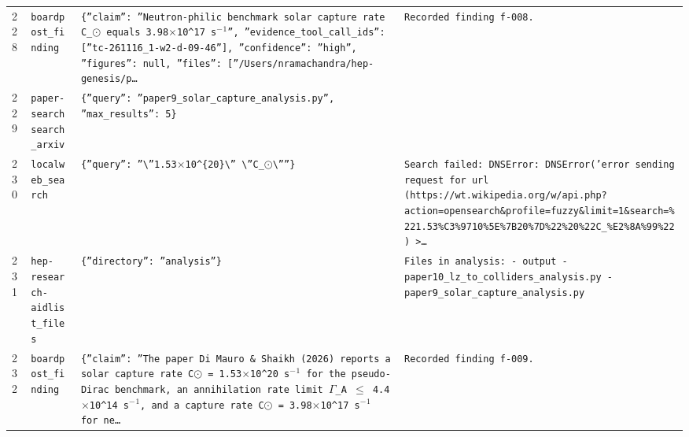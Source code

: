 \documentclass[11pt,a4paper]{article}
\begin{document}
\begin{longtable}{@{}p{}p{}p{}p{}@{}}
228 & \texttt{board}\newline\texttt{post\_\allowbreak{}finding} & \texttt{\{''claim'':\allowbreak{} ''Neutron-philic benchmark solar capture rate C\_\allowbreak{}$\odot$ equals 3.98$\times$10\textasciicircum{}\allowbreak{}17~s$^-$$^1$'',\allowbreak{} ''evidence\_\allowbreak{}tool\_\allowbreak{}call\_\allowbreak{}ids'':\allowbreak{} [''tc-261116\_\allowbreak{}1-w2-d-09-46'']\allowbreak{},\allowbreak{} ''confidence'':\allowbreak{} ''high'',\allowbreak{} ''figures'':\allowbreak{} null,\allowbreak{} ''files'':\allowbreak{} [''/\allowbreak{}Users/\allowbreak{}nramachandra/\allowbreak{}hep-genesis/\allowbreak{}p\ldots{}\allowbreak{}} & \texttt{Recorded finding f-008.} \\
229 & \texttt{paper-search}\newline\texttt{search\_\allowbreak{}arxiv} & \texttt{\{''query'':\allowbreak{} ''paper9\_\allowbreak{}solar\_\allowbreak{}capture\_\allowbreak{}analysis.py'',\allowbreak{} ''max\_\allowbreak{}results'':\allowbreak{} 5\}\allowbreak{}} & \texttt{} \\
230 & \texttt{local}\newline\texttt{web\_\allowbreak{}search} & \texttt{\{''query'':\allowbreak{} ''\textbackslash{}\allowbreak{}''1.53$\times$10\textasciicircum{}\allowbreak{}\{20\}\allowbreak{}\textbackslash{}\allowbreak{}'' \textbackslash{}\allowbreak{}''C\_\allowbreak{}$\odot$\textbackslash{}\allowbreak{}''''\}\allowbreak{}} & \texttt{Search failed:\allowbreak{} DNSError:\allowbreak{} DNSError('error sending request for url (https:\allowbreak{}/\allowbreak{}/\allowbreak{}wt.wikipedia.org/\allowbreak{}w/\allowbreak{}api.php?action=\allowbreak{}opensearch\&profile=\allowbreak{}fuzzy\&limit=\allowbreak{}1\&search=\allowbreak{}\%221.53\%C3\%9710\%5E\%7B20\%7D\%22\%20\%22C\_\allowbreak{}\%E2\%8A\%99\%22)\allowbreak{} \textgreater{}\allowbreak{}\ldots{}\allowbreak{}} \\
231 & \texttt{hep-research-aid}\newline\texttt{list\_\allowbreak{}files} & \texttt{\{''directory'':\allowbreak{} ''analysis''\}\allowbreak{}} & \texttt{Files in analysis:\allowbreak{}   - output   - paper10\_\allowbreak{}lz\_\allowbreak{}to\_\allowbreak{}colliders\_\allowbreak{}analysis.py   - paper9\_\allowbreak{}solar\_\allowbreak{}capture\_\allowbreak{}analysis.py} \\
232 & \texttt{board}\newline\texttt{post\_\allowbreak{}finding} & \texttt{\{''claim'':\allowbreak{} ''The paper Di~Mauro \& Shaikh (2026)\allowbreak{} reports a solar capture rate C$\odot$ =\allowbreak{} 1.53$\times$10\textasciicircum{}\allowbreak{}20 s$^-$$^1$ for the pseudo-Dirac benchmark,\allowbreak{} an annihilation rate limit $\Gamma$\_\allowbreak{}A $\leq$ 4.4$\times$10\textasciicircum{}\allowbreak{}14 s$^-$$^1$,\allowbreak{} and a capture rate C$\odot$ =\allowbreak{} 3.98$\times$10\textasciicircum{}\allowbreak{}17 s$^-$$^1$ for ne\ldots{}\allowbreak{}} & \texttt{Recorded finding f-009.} \\

\end{longtable}
\end{document}
